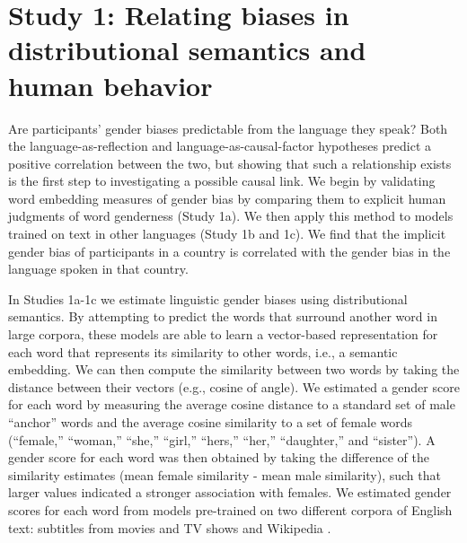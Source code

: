 \documentclass[9pt,twocolumn,twoside]{pnas-new}
\begin{document}
\section*{Study 1: Relating biases in distributional semantics and
human
behavior}\label{study-1-relating-gender-biases-in-distributional-semantics-and-human-behavior}

Are participants' gender biases predictable from the language they
speak? Both the language-as-reflection and language-as-causal-factor
hypotheses predict a positive correlation between the two, but showing
that such a relationship exists is the first step to investigating a
possible causal link. We begin by validating word embedding measures of
gender bias by comparing them to explicit human judgments of word
genderness (Study 1a). We then apply this method to models trained on
text in other languages (Study 1b and 1c). We find that the implicit gender
bias of participants in a country is correlated with the gender bias in
the language spoken in that country.


In Studies 1a-1c we estimate linguistic gender biases using distributional semantics. By attempting to predict the words that surround another word in large corpora, these models   \citep[e.g.,][]{mikolov2013efficient} are able to learn a vector-based representation for each word that represents its similarity to other words, i.e., a semantic embedding. We can then compute the similarity between two words by taking the distance between their vectors (e.g., cosine of angle). 
We estimated a gender score for each word by measuring the average cosine distance to a standard set of
male \enquote{anchor} words \citep[\enquote{male,} \enquote{man,}
\enquote{he,} \enquote{boy,} \enquote{his,} \enquote{him,}
\enquote{son,} and \enquote{brother};][]{nosek2002harvesting}
and the average cosine similarity to a set of female words
(\enquote{female,} \enquote{woman,} \enquote{she,} \enquote{girl,}
\enquote{hers,} \enquote{her,} \enquote{daughter,} and
\enquote{sister}). A gender score for each word was then obtained by
taking the difference of the similarity estimates (mean female similarity
- mean male similarity), such that larger values indicated a stronger
association with females. We estimated  gender scores for each word from
models pre-trained on two different corpora of English text: subtitles from movies
and TV shows \cite{vanparidon,lison} and Wikipedia
\cite{bojanowski2016enriching}.
\end{document}
